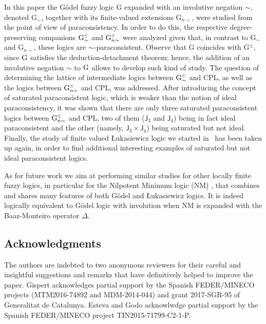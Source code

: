 \documentclass{article}
\theoremstyle{definition}
\newcommand{\Gsimleq}{\mathrm{G}\mystrut^{\text{\tiny $\leq$}}_{\sim}}
\newcommand{\Gnsimleq}{\mathrm{G}\mystrut^{\text{\tiny $\leq$}}_{n\sim}}
\newcommand\mystrut{\rule{0pt}{7pt}}
\begin{document}
In this paper the G\"odel fuzzy logic G expanded with an involutive negation $\sim$, denoted G$_\sim$, together with  its finite-valued extensions G$_{n\sim}$, were studied from the point of view of paraconsistency. In order to do this,  the respective degree-preserving companions $\Gsimleq$  and $\Gnsimleq$ were analyzed given that, in contrast to  G$_\sim$ and G$_{n\sim}$, these logics are $\sim$-paracon\-sis\-tent. Observe that G coincides with G$^\leq$, since $\rm{G}$ satisfies the deduction-detachment theorem; hence, the addition of an involutive negation $\sim$ to $\rm{G}$ allows to develop such kind of study. The question of determining the lattice of intermediate logics between $\Gsimleq$ and CPL, as well as the logics between $\Gnsimleq$ and CPL, was addressed. After introducing the  concept of saturated paraconsistent logic, which is weaker than the notion of ideal paraconsistency, it was shown that  there are only three saturated paraconsistent logics {between $\Gnsimleq$ and CPL}, two of them ($\mathsf{J}_3$ and $\mathsf{J}_4$) being in fact ideal paraconsistent and the other (namely, $\mathsf{J}_3 \times \mathsf{J}_4$) being saturated but not ideal.
Finally, the study of finite valued {\L}ukasiewicz logic we started in~\cite{CoEsGiGo}  has been taken up again, in order to find additional  interesting examples of saturated but not ideal  paraconsistent logics.

As for future work we aim at performing similar studies for other locally finite fuzzy logics, in particular for the Nilpotent Minimum logic (NM) \cite{Esteva-Godo:Monoidal}, that combines and shares many features of both G\"odel and {\L}ukasiewicz logics. It is indeed logically equivalent to G\"odel logic with involution when NM is expanded with the Baaz-Monteiro operator $\Delta$.


\subsection*{Acknowledgments} The authors are indebted to two anonymous reviewers for their careful and insightful suggestions and remarks that have definitively helped to improve the paper. Gispert acknowledges partial support by the Spanish FEDER/MINECO projects (MTM2016-74892 and MDM-2014-044) and grant 2017-SGR-95 of
Generalitat de Catalunya. Esteva and Godo acknowlwdge partial support by the Spanish FEDER/MINECO project TIN2015-71799-C2-1-P.
\end{document}
